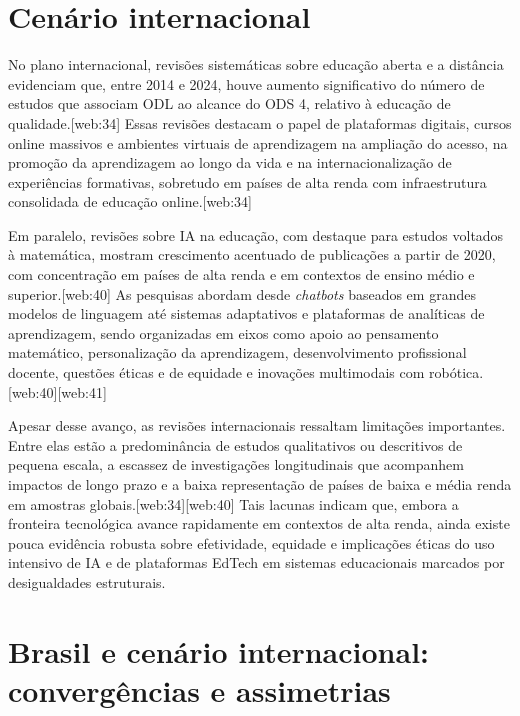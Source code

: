 \documentclass[12pt]{article}
\begin{document}
\section{Cen\'ario internacional}

No plano internacional, revis\~oes sistem\'aticas sobre educa\c{c}\~ao aberta e a dist\^ancia evidenciam que, entre 2014 e 2024, houve aumento significativo do n\'umero de estudos que associam ODL ao alcance do ODS 4, relativo \`a educa\c{c}\~ao de qualidade.[web:34] Essas revis\~oes destacam o papel de plataformas digitais, cursos online massivos e ambientes virtuais de aprendizagem na amplia\c{c}\~ao do acesso, na promo\c{c}\~ao da aprendizagem ao longo da vida e na internacionaliza\c{c}\~ao de experi\^encias formativas, sobretudo em pa\'ises de alta renda com infraestrutura consolidada de educa\c{c}\~ao online.[web:34]

Em paralelo, revis\~oes sobre IA na educa\c{c}\~ao, com destaque para estudos voltados \`a matem\'atica, mostram crescimento acentuado de publica\c{c}\~oes a partir de 2020, com concentra\c{c}\~ao em pa\'ises de alta renda e em contextos de ensino m\'edio e superior.[web:40] As pesquisas abordam desde \emph{chatbots} baseados em grandes modelos de linguagem at\'e sistemas adaptativos e plataformas de anal\'iticas de aprendizagem, sendo organizadas em eixos como apoio ao pensamento matem\'atico, personaliza\c{c}\~ao da aprendizagem, desenvolvimento profissional docente, quest\~oes \'eticas e de equidade e inova\c{c}\~oes multimodais com rob\'otica.[web:40][web:41]

Apesar desse avan\c{c}o, as revis\~oes internacionais ressaltam limita\c{c}\~oes importantes. Entre elas est\~ao a predomin\^ancia de estudos qualitativos ou descritivos de pequena escala, a escassez de investiga\c{c}\~oes longitudinais que acompanhem impactos de longo prazo e a baixa representa\c{c}\~ao de pa\'ises de baixa e m\'edia renda em amostras globais.[web:34][web:40] Tais lacunas indicam que, embora a fronteira tecnol\'ogica avance rapidamente em contextos de alta renda, ainda existe pouca evid\^encia robusta sobre efetividade, equidade e implica\c{c}\~oes \'eticas do uso intensivo de IA e de plataformas EdTech em sistemas educacionais marcados por desigualdades estruturais.

\section{Brasil e cen\'ario internacional: converg\^encias e assimetrias}
\end{document}
